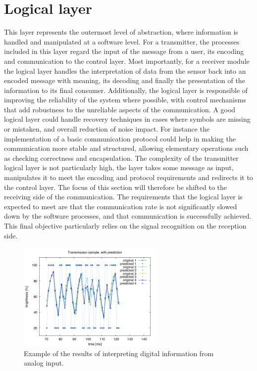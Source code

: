 
\section{Logical layer}
\label{logical}
This layer represents the outermost level of abstraction, where information is handled and manipulated at a software level.
For a transmitter, the processes included in this layer regard the input of the message from a user, its encoding and communication to the control layer.
Most importantly, for a receiver module the logical layer handles the interpretation of data from the sensor back into an encoded message with meaning, its decoding and finally the presentation of the information to its final consumer.
Additionally, the logical layer is responsible of improving the reliability of the system where possible, with control mechanisms that add robustness to the unreliable aspects of the communication.
A good logical layer could handle recovery techniques in cases where symbols are missing or mistaken, and overall reduction of noise impact. 
For instance the implementation of a basic communication protocol could help in making the communication more stable and structured, allowing elementary operations such as checking correctness and encapsulation.
The complexity of the transmitter logical layer is not particularly high, the layer takes some message as input, manipulates it to meet the encoding and protocol requirements and redirects it to the control layer. 
The focus of this section will therefore be shifted to the receiving side of the communication.
The requirements that the logical layer is expected to meet are that the communication rate is not significantly slowed down by the software processes, and that communication is successfully achieved.
This final objective particularly relies on the signal recognition on the reception side.
 
\begin{figure}[htbp]
   \centering
   \includegraphics[height=200px]{img/sample} 
   \caption{Example of the results of interpreting digital information from analog input.}
   \label{fig:sample}
\end{figure}

